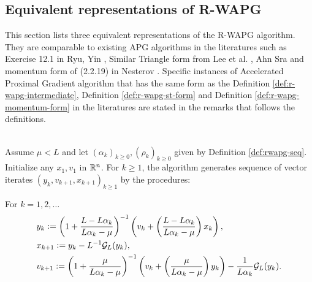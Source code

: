 \documentclass[12pt]{article}
\begin{document}
    \subsection{Equivalent representations of R-WAPG}
        This section lists three equivalent representations of the R-WAPG algorithm.
        They are comparable to existing APG algorithms in the literatures such as Exercise 12.1 in Ryu, Yin \cite{ryu_large-scale_2022}, Similar Triangle form from Lee et al. \cite{lee_geometric_2021}, Ahn Sra \cite{ahn_understanding_2022} and momentum form of (2.2.19) in Nesterov \cite{nesterov_lectures_2018}.
        Specific instances of Accelerated Proximal Gradient algorithm that has the same form as the Definition \ref{def:r-wapg-intermediate}, Definition \ref{def:r-wapg-st-form} and Definition \ref{def:r-wapg-momentum-form} in the literatures are stated in the remarks that follows the definitions.
        \begin{definition}\label{def:r-wapg-intermediate}\;\\
            Assume $\mu < L$ and let $(\alpha_k)_{k \ge 0}, (\rho_k)_{k \ge 0}$ given by Definition \ref{def:rwapg-seq}.
            Initialize any $x_1, v_1$ in $\mathbb R^n$.
            For $k \ge 1$, the algorithm generates sequence of vector iterates $(y_{k}, v_{k + 1}, x_{k + 1})_{k \ge 1}$ by the procedures:
            \begin{tcolorbox}
                For $k = 1, 2, \ldots$
                \begin{align*}
                    & y_{k} \vcentcolon=
                    \left(
                        1 + \frac{L - L\alpha_{k}}{L\alpha_{k} - \mu}
                    \right)^{-1}
                    \left(
                        v_{k} +
                        \left(\frac{L - L\alpha_{k}}{L\alpha_{k} - \mu} \right) x_{k}
                    \right),
                    \\
                    & x_{k + 1} \vcentcolon=
                    y_k - L^{-1} \mathcal G_L (y_k),
                    \\
                    & v_{k + 1} \vcentcolon=
                    \left(
                        1 + \frac{\mu}{L \alpha_k - \mu}
                    \right)^{-1}
                    \left(
                        v_k +
                        \left(\frac{\mu}{L \alpha_k - \mu}\right) y_k
                    \right) - \frac{1}{L\alpha_{k}}\mathcal G_L (y_k).
                \end{align*}
            \end{tcolorbox}
        \end{definition}
\end{document}
